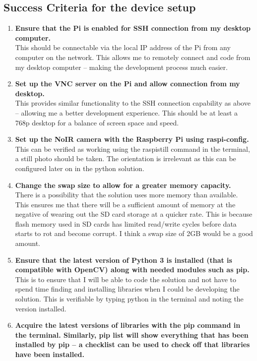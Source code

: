 \documentclass[9pt]{article}
\begin{document}
\begin{small}
	\subsection{Success Criteria for the device setup}\label{sec_device}
	\begin{enumerate}
	\setlength{\itemsep}{4pt}
	\setlength{\parskip}{0pt}
	\item \textbf{Ensure that the Pi is enabled for SSH connection from my desktop computer.}\\
		This should be connectable via the local IP address of the Pi from any computer on the network. This allows me to remotely connect and code from my desktop computer – making the development process much easier.
	\item \textbf{Set up the VNC server on the Pi and allow connection from my desktop.}\\
		This provides similar functionality to the SSH connection capability as above – allowing me a better development experience. This should be at least a 768p desktop for a balance of screen space and speed.
	\item \textbf{Set up the NoIR camera with the Raspberry Pi using raspi-config.}\\
		This can be verified as working using the raspistill command in the terminal, a still photo should be taken. The orientation is irrelevant as this can be configured later on in the python solution.
	\item \textbf{Change the swap size to allow for a greater memory capacity.}\\
		There is a possibility that the solution uses more memory than available. This ensures me that there will be a sufficient amount of memory at the negative of wearing out the SD card storage at a quicker rate. This is because flash memory used in SD cards has limited read/write cycles before data starts to rot and become corrupt. I think a swap size of 2GB would be a good amount.
	\item \textbf{Ensure that the latest version of Python 3 is installed (that is compatible with OpenCV) along with needed modules such as pip.}\\
		This is to ensure that I will be able to code the solution and not have to spend time finding and installing libraries when I could be developing the solution. This is verifiable by typing python in the terminal and noting the version installed. 
	\item \textbf{Acquire the latest versions of libraries with the pip command in the terminal. Similarly, pip list will show everything that has been installed by pip – a checklist can be used to check off that libraries have been installed.}
	\end{enumerate}
\end{small}
\end{document}
